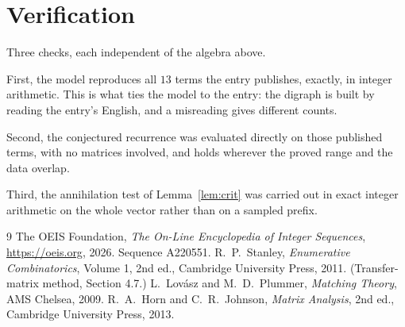 \documentclass[11pt,a4paper]{article}
\theoremstyle{plain}
\theoremstyle{definition}
\begin{document}
\section{Verification}

Three checks, each independent of the algebra above.

First, the model reproduces all $13$ terms the entry publishes, exactly, in integer
arithmetic. This is what ties the model to the entry: the digraph is built by reading the
entry's English, and a misreading gives different counts.

Second, the conjectured recurrence was evaluated directly on those published terms, with no
matrices involved, and holds wherever the proved range and the data overlap.

Third, the annihilation test of Lemma~\ref{lem:crit} was carried out in exact integer
arithmetic on the whole vector rather than on a sampled prefix.

\begin{thebibliography}{9}
 The OEIS Foundation, \emph{The On-Line Encyclopedia of Integer
Sequences}, \url{https://oeis.org}, 2026. Sequence A220551.
 R.~P.~Stanley, \emph{Enumerative Combinatorics}, Volume 1, 2nd ed.,
Cambridge University Press, 2011. (Transfer-matrix method, Section 4.7.)
 L.~Lov\'asz and M.~D.~Plummer, \emph{Matching Theory}, AMS Chelsea,
2009.
 R.~A.~Horn and C.~R.~Johnson, \emph{Matrix Analysis}, 2nd ed., Cambridge
University Press, 2013.
\end{thebibliography}
\end{document}
